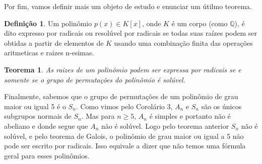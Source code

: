 \documentclass[a4paper,12pt]{article}
\newtheorem*{theorem}{Teorema}
\theoremstyle{definition}
\newtheorem{definition}{Definição}
\theoremstyle{remark}
\begin{document}
Por fim, vamos definir mais um objeto de estudo e enunciar um útilmo teorema.

\begin{definition}
    Um polinômio $p(x) \in K[x]$, onde $K$ é um corpo (como $\mathbb{Q}$), é dito expresso por radicais ou resolúvel por radicais
    se todas suas raízes podem ser obtidas a partir de elementos de $K$ usando uma combinação finita das operações aritmeticas e raizes n-esimas.
\end{definition}

\begin{theorem}
    As raizes de um polinômio podem ser expressa por radicais se e somente se o grupo de permutações do polinômio é solúvel.
\end{theorem}

Finalmente, sabemos que o grupo de permutações de um polinômio de grau maior ou igual 5 é o $S_n$. Como vimos pelo Corolário 3, $A_n$ e $S_n$ são os 
únicos subgrupos normais de $S_n$. Mas para $n \geq 5$, $A_n$ é simples e portanto não é abeliano e donde segue que $A_n$ não é solúvel.
Logo pelo teorema anterior $S_n$ não é solúvel, e pelo teorema de Galois, o polinômio de grau maior ou igual a 5 não pode ser escrito 
por radicais. Isso equivale a dizer que não temos uma fórmula geral para esses polinômios.
\end{document}
